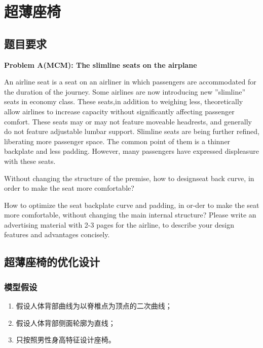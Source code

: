 

\chapter{超薄座椅}
\section{题目要求}
    \par
    \textbf{Problem A(MCM): The slimline seats on the airplane}
    \par
    An airline seat is a seat on an airliner in which passengers are accommodated for the duration of the journey. Some airlines are now introducing new ”slimline” seats in economy class. These seats,in addition to weighing less, theoretically allow airlines to increase capacity without significantly affecting passenger comfort. These seats may or may not feature moveable headrests, and generally do not feature adjustable lumbar support. Slimline seats are being further refined, liberating more passenger space. The common point of them is a thinner backplate and less padding. However, many passengers have expressed displeasure with these seats.
    \par
    Without changing the structure of the premise, how to designseat back curve, in order to make the seat more comfortable?
    \par
    How to optimize the seat backplate curve and padding, in or-der to make the seat more comfortable, without changing the main internal structure? Please write an advertising material with 2-3 pages for the airline, to describe your design features and advantages concisely.

\section{超薄座椅的优化设计}
    \subsection{模型假设}
        \begin{enumerate}
        \item 假设人体背部曲线为以脊椎点为顶点的二次曲线；
        \item 假设人体背部侧面轮廓为直线；
        \item 只按照男性身高特征设计座椅。
        \end{enumerate}
